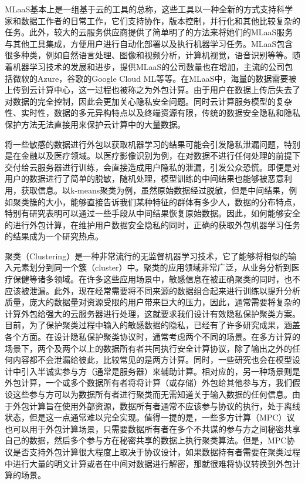 MLaaS基本上是一组基于云的工具的总称，这些工具以一种全新的方式支持科学家和数据工作者的日常工作，它们支持协作，版本控制，并行化和其他比较复杂的任务。此外，较大的云服务供应商提供了简单明了的方法来将她们的MLaaS服务与其他工具集成，方便用户进行自动化部署以及执行机器学习任务。MLaaS包含很多种类，例如自然语言处理、图像和视频分析，计算机视觉，语音识别等等。随着机器学习技术的发展和进步，提供MLaaS的公司数量也在增加，主流的公司包括微软的Azure，谷歌的Google Cloud ML等等。在MLaaS中，海量的数据需要被上传到云计算中心，这一过程也被称之为外包计算。由于用户在数据上传后失去了对数据的完全控制，因此会更加关心隐私安全问题。同时云计算服务模型的复杂性、实时性，数据的多元异构特点以及终端资源有限，传统的数据安全隐私和隐私保护方法无法直接用来保护云计算中的大量数据\cite{hunt2018chiron}。

将一些敏感的数据进行外包以获取机器学习的结果可能会引发隐私泄漏问题，特别是在金融以及医疗领域。以医疗影像识别为例，在对数据不进行任何处理的前提下交付给云服务器进行训练，会直接造成用户隐私的泄漏，引发公众恐慌。即便是对用户的数据进行了简单的脱敏，随机处理，模型训练的中间结果也能够被恶意利用，获取信息。以k-means聚类为例，虽然原始数据经过脱敏，但是中间结果，例如聚类簇的大小，能够直接告诉我们某种特征的群体有多少人，数据的分布特点，特别有研究表明可以通过一些手段从中间结果恢复原始数据。因此，如何能够安全的进行外包计算，在维护用户数据安全隐私的同时，正确的获取外包机器学习任务的结果成为一个研究热点。

聚类（Clustering）是一种非常流行的无监督机器学习技术，它了能够将相似的输入元素划分到同一个簇（cluster）中。聚类的应用领域非常广泛，从业务分析到医疗保健等诸多领域。在许多这些应用场景中，敏感信息在被正确聚类的同时，也不应该被泄漏。此外，现在经常需要将不同来源的数据组合起来进行训练以提升分析质量，庞大的数据量对资源受限的用户带来巨大的压力，因此，通常需要将复杂的计算外包给强大的云服务器进行处理，这就要求我们设计有效隐私保护聚类方案\cite{ahmed2020k}。目前，为了保护聚类过程中输入的敏感数据的隐私，已经有了许多研究成果，涵盖各个方面。在设计隐私保护聚类协议时，通常考虑两个不同的场景。在多方计算的场景下\cite{cramer2015secure}，两个及两个以上的数据所有者共同执行安全计算协议，除了输出之外的任何内容都不会泄漏给彼此，比较常见的是两方计算。同时，一些研究也会在模型设计中引入半诚实参与方（通常是服务器）来辅助计算。相对应的，另一种场景则是外包计算\cite{li2018privacy}，一个或多个数据所有者将将计算（或存储）外包给其他参与方，我们假设这些参与方可以为数据所有者进行聚类而无需知道关于输入数据的任何信息。由于外包计算旨在使用外部资源，数据所有者通常不应该参与协议的执行，处于离线状态，但是这一点通常难以完全实现。值得一提的是，一些多方计算（MPC）议也可以用于外包计算场景，只需要数据所有者在多个不共谋的参与方之间秘密共享自己的数据，然后多个参与方在秘密共享的数据上执行聚类算法。但是，MPC协议是否支持外包计算很大程度上取决于协议设计，如果数据持有者需要在聚类过程中进行大量的明文计算或者在中间对数据进行解密，那就很难将协议转换到外包计算的场景。

